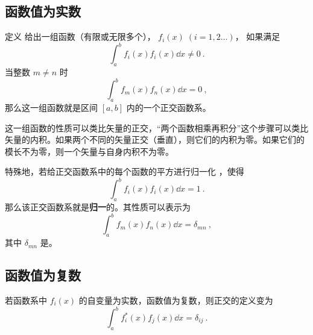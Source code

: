 
\subsection{函数值为实数}

定义
给出一组函数（有限或无限多个）， $f_i(x)\; (i = 1,2\dots)$， 如果满足
\begin{equation}
\int_a^b f_i(x) f_i(x) \dd{x} \ne 0~.
\end{equation} 
当整数 $m \ne n$ 时
\begin{equation}
\int_a^b f_m(x) f_n(x) \dd{x} = 0~,
\end{equation} 
那么这一组函数就是区间 $[a,b]$ 内的一个正交函数系。

这一组函数的性质可以类比矢量的正交，“两个函数相乘再积分”这个步骤可以类比矢量的内积。如果两个不同的矢量正交（垂直），则它们的内积为零。如果它们的模长不为零，则一个矢量与自身内积不为零。

特殊地，若给正交函数系中的每个函数的平方进行归一化%
，使得
\begin{equation}
\int_a^b f_i(x) f_i(x) \dd{x} = 1~.
\end{equation} 
那么该正交函数系就是\textbf{归一}的。其性质可以表示为
 \begin{equation}
\int_a^b f_m(x) f_n(x) \dd{x} = \delta_{mn}~,
\end{equation} 
其中 $\delta_{mn}$ 是。


\subsection{函数值为复数}

若函数系中 $f_i(x)$ 的自变量为实数，函数值为复数，则正交的定义变为
 \begin{equation}
\int_a^b f_i^*(x) f_j(x) \dd{x} = \delta_{ij}~.
\end{equation}
